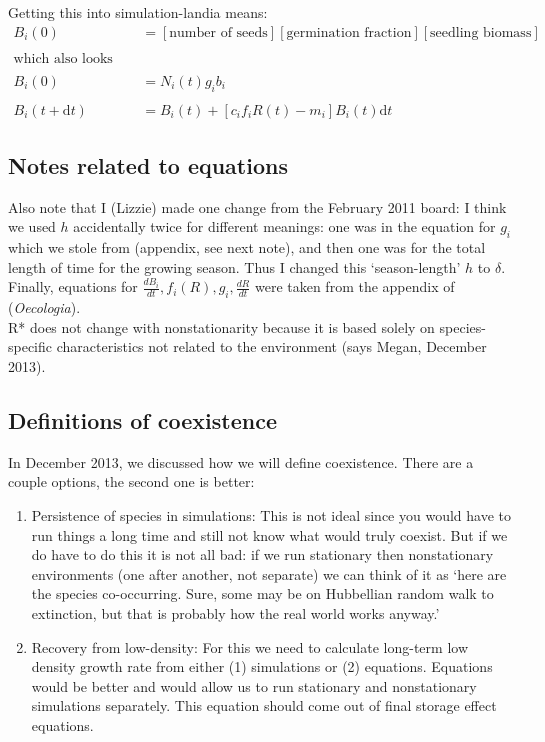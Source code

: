 \documentclass[11pt,a4paper,oneside]{article}
\begin{document}
\noindent Getting this into simulation-landia means:
\begin{align*}
B_{i}(0) & = [\text{number of seeds}][\text{germination
  fraction}][\text{seedling biomass}]
\\
\\
\text{which also looks like:}
\\
\\
B_{i}(0) & = N_{i}(t) g_{i}b_{i}
\\
\\
B_{i}(t+\mathrm{d}t) & =B_{i}(t)+[c_{i}f_{i}R(t)-m_{i}]B_{i}(t)\mathrm{d}t
\end{align*}

\subsection{Notes related to equations}

\noindent Also note that I (Lizzie) made one change from the February 2011 board: I think we
used \(h\) accidentally twice for different meanings: one was in the
equation for \(g_{i}\) which we stole from \cite{Chesson:2004eo}
(appendix, see next note), and then one was for the total length of time for the
growing season. Thus I changed this `season-length' \(h\) to
\(\delta\).\\

\noindent Finally, equations for \(\frac{dB_{i}}{dt}, f_{i}(R), g_{i},
\frac{dR}{dt}\) were taken from the appendix of \cite{Chesson:2004eo} (\emph{Oecologia}).\\

\noindent R* does not change with nonstationarity because it is based solely on species-specific characteristics not related to the environment (says Megan, December 2013).

\subsection{Definitions of coexistence}
\noindent In December 2013, we discussed how we will define coexistence. There are a couple options, the second one is better:
\begin{enumerate}
\item Persistence of species in simulations: This is not ideal since you would have to run things a long time and still not know what would truly coexist. But if we do have to do this it is not all bad: if we run stationary then nonstationary environments (one after another, not separate) we can think of it as `here are the species co-occurring. Sure, some may be on Hubbellian random walk to extinction, but that is probably how the real world works anyway.' 
\item Recovery from low-density: For this we need to calculate long-term low density growth rate from either (1) simulations or (2) equations. Equations would be better and would allow us to run stationary and nonstationary simulations separately. This equation should come out of final storage effect equations.
\end{enumerate}
\end{document}
